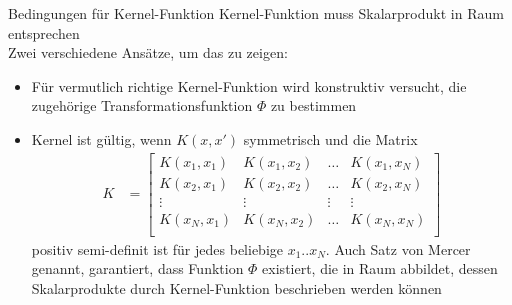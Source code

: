 \documentclass[ngerman]{beamer}
\begin{document}
\begin{frame}{Bedingungen für Kernel-Funktion}
    Kernel-Funktion muss Skalarprodukt in Raum entsprechen \\
    Zwei verschiedene Ansätze, um das zu zeigen: \\ \pause
    \begin{itemize}
        \item Für vermutlich richtige Kernel-Funktion wird konstruktiv versucht, die zugehörige Transformationsfunktion $\Phi$ zu bestimmen
        \item Kernel ist gültig, wenn $K(x, x')$ symmetrisch und die Matrix \[
                                                                                \begin{aligned}
                                                                                    K &=
                                                                                    \begin{bmatrix}
                                                                                        K(x_{1}, x_{1}) & K(x_{1}, x_{2}) & \dots & K(x_{1}, x_{N})\\
                                                                                        K(x_{2}, x_{1}) & K(x_{2}, x_{2}) & \dots & K(x_{2}, x_{N})\\
                                                                                        \vdots & \vdots & \vdots & \vdots\\
                                                                                        K(x_{N}, x_{1}) & K(x_{N}, x_{2}) & \dots & K(x_{N}, x_{N})\\
                                                                                    \end{bmatrix}
                                                                                \end{aligned}
        \] positiv semi-definit ist für jedes beliebige $x_1..x_N$. \pause
        Auch Satz von Mercer genannt, garantiert, dass Funktion $\Phi$ existiert, die in Raum abbildet, dessen Skalarprodukte durch Kernel-Funktion beschrieben werden können
    \end{itemize}
\end{frame}
\end{document}
